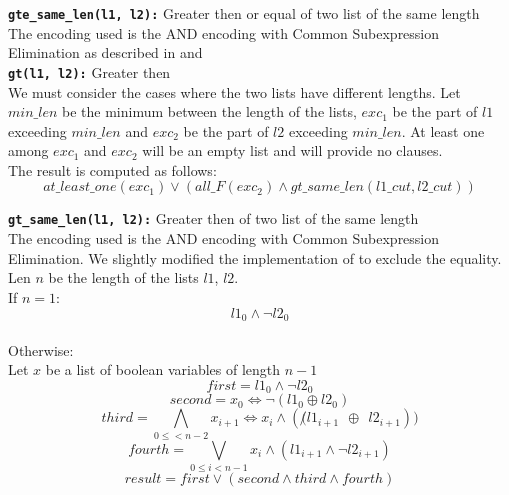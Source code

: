   \texttt{\textbf{gte\_same\_len(l1, l2):}} Greater then or equal of two list of the same length\\
  The encoding used is the AND encoding with Common Subexpression Elimination as described in 
  \cite{Elgabou} and \cite{Zhao}\\

  \texttt{\textbf{gt(l1, l2):}} Greater then\\
  We must consider the cases where the two lists have different lengths.
  Let $min\_len$ be the minimum between the length of the lists, $exc_1$ be the part of $l1$ 
  exceeding $min\_len$ and $exc_2$ 
  be the part of $l2$ exceeding $min\_len$. At least one among $exc_1$ and $exc_2$ will be an
  empty list and will provide no clauses.\\
  The result is computed as follows:
  \begin{equation}
      at\_least\_one(exc_1) \vee ( all\_F(exc_2) \wedge gt\_same\_len(l1\_cut, l2\_cut))
  \end{equation}

  \texttt{\textbf{gt\_same\_len(l1, l2):}} Greater then of two list of the same length\\
  The encoding used is the AND encoding with Common Subexpression Elimination. We slightly
  modified the implementation of \cite{Zhao} to exclude the equality.\\
  Len $n$ be the length of the lists $l1$, $l2$.\\
  If $n=1$:
  \begin{equation*}
      l1_0 \wedge \neg l2_0
  \end{equation*}\\

  Otherwise:\\
  Let $x$ be a list of boolean variables of length $n-1$
  \begin{equation*}
      first =  l1_0 \wedge \neg l2_0 %
  \end{equation*}
  \begin{equation*}
      second = x_0 \Longleftrightarrow \neg (l1_0 \oplus l2_0) %
  \end{equation*}
  \begin{equation*}
      third = \bigwedge\limits_{0 \leq <n-2} x_{i+1} \Longleftrightarrow x_i \wedge (\not (l1_{i+1} \ \ \oplus \ \ l2_{i+1}))%
  \end{equation*}
  \begin{equation*}
      fourth = \bigvee\limits_{0 \leq i < n-1} x_i \wedge (l1_{i+1} \wedge \neg l2_{i+1})
  \end{equation*}
  \begin{equation*}
      result = first \vee (second \wedge third \wedge fourth)
  \end{equation*}

